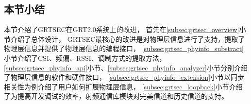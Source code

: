 		\subsection{本节小结}\label{subsec:grt2.0_summary}
		本节介绍了GRTSEC在GRT2.0系统上的改进，
		首先在\ref{subsec:grtsec_overview}小节介绍了总体设计，
		GRTSEC最核心的改进是对物理层信息进行了支持，提取了物理层信息并提供了物理层信息的编程接口，
		\ref{subsec:grtsec_phyinfo_substract}小节介绍了CSI、频偏、RSSI、调制方式的提取方法，
		\ref{subsec:grtsec_phyinfo_api}小节、\ref{subsec:grtsec_phyinfo_analyzer}小节分别介绍了物理层信息的软件和硬件接口，
		\ref{subsec:grtsec_phyinfo_extension}小节以同步相关性为例介绍了用户如何扩展物理层信息，
		\ref{subsec:grtsec_loopback}小节介绍了为提高开发调试的效率，射频通信库模块对完美信道和历史信道的支持。
